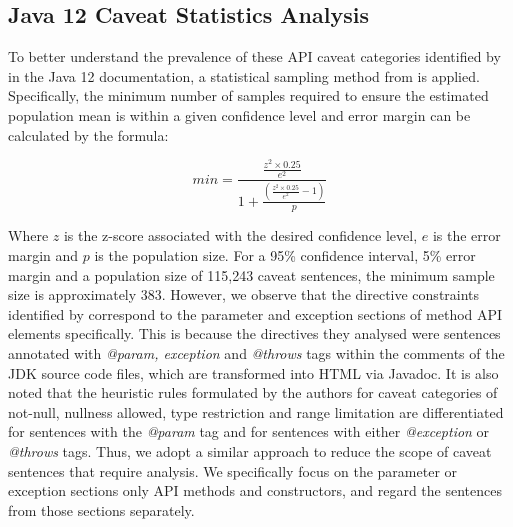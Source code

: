 \subsection{Java 12 Caveat Statistics Analysis}
\label{subsec:contract-caveat-statistics}
To better understand the prevalence of these API caveat categories identified by \cite{zhou-directive} in the Java 12 documentation, a statistical sampling method from \cite{singh2013elements} is applied. Specifically, the minimum number of samples required to ensure the estimated population mean is within a given confidence level and error margin can be calculated by the formula:

\begin{equation}
\label{sample}
min=\frac{\frac{z^2\times 0.25}{e^2}}{1 + \frac{(\frac{z^2\times 0.25}{e^2} - 1)}{p}}
\end{equation}

Where $z$ is the z-score associated with the desired confidence level, $e$ is the error margin and $p$ is the population size. For a 95\% confidence interval, 5\% error margin and a population size of 115,243 caveat sentences, the minimum sample size is approximately 383. However, we observe that the directive constraints identified by \cite{zhou-directive} correspond to the parameter and exception sections of method API elements specifically. This is because the directives they analysed were sentences annotated with \textit{@param, exception} and \textit{@throws} tags within the comments of the JDK source code files, which are transformed into HTML via Javadoc. It is also noted that the heuristic rules formulated by the authors for caveat categories of not-null, nullness allowed, type restriction and range limitation are differentiated for sentences with the \textit{@param} tag and for sentences with either \textit{@exception} or \textit{@throws} tags. Thus, we adopt a similar approach to reduce the scope of caveat sentences that require analysis. We specifically focus on the parameter or exception sections only API methods and constructors, and regard the sentences from those sections separately. \\

